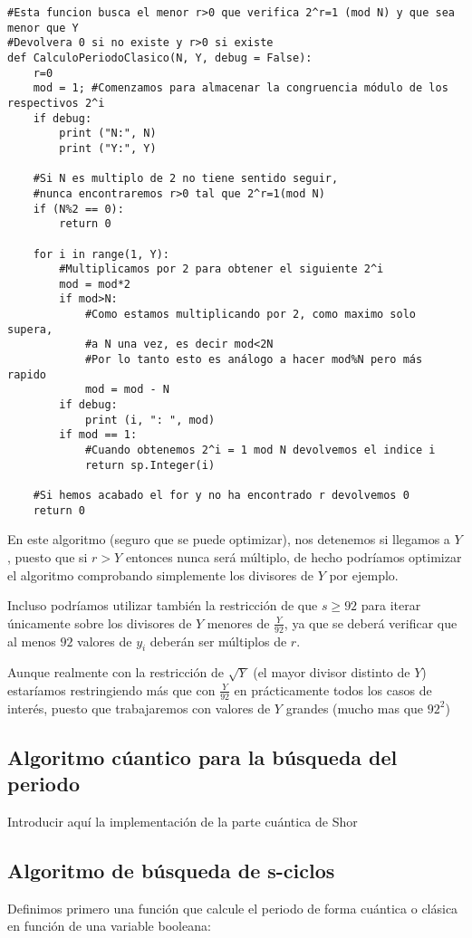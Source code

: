 \begin{verbatim}
#Esta funcion busca el menor r>0 que verifica 2^r=1 (mod N) y que sea menor que Y
#Devolvera 0 si no existe y r>0 si existe
def CalculoPeriodoClasico(N, Y, debug = False):
    r=0
    mod = 1; #Comenzamos para almacenar la congruencia módulo de los respectivos 2^i
    if debug:
        print ("N:", N)
        print ("Y:", Y)
        
    #Si N es multiplo de 2 no tiene sentido seguir,
    #nunca encontraremos r>0 tal que 2^r=1(mod N)
    if (N%2 == 0):
        return 0
    
    for i in range(1, Y):
        #Multiplicamos por 2 para obtener el siguiente 2^i
        mod = mod*2
        if mod>N:
            #Como estamos multiplicando por 2, como maximo solo supera,
            #a N una vez, es decir mod<2N
            #Por lo tanto esto es análogo a hacer mod%N pero más rapido
            mod = mod - N
        if debug:
            print (i, ": ", mod)
        if mod == 1:
            #Cuando obtenemos 2^i = 1 mod N devolvemos el indice i
            return sp.Integer(i)
    
    #Si hemos acabado el for y no ha encontrado r devolvemos 0
    return 0
\end{verbatim}

En este algoritmo (seguro que se puede optimizar), nos detenemos si llegamos a $Y$, puesto que si $r>Y$ entonces nunca será múltiplo, de hecho podríamos optimizar el algoritmo comprobando simplemente los divisores de $Y$ por ejemplo.

Incluso podríamos utilizar también la restricción de que $s\geq92$ para iterar únicamente sobre los divisores de $Y$ menores de $\frac{Y}{92}$, ya que se deberá verificar que al menos $92$ valores de $y_i$ deberán ser múltiplos de $r$.

Aunque realmente con la restricción de $\sqrt{Y}$ (el mayor divisor distinto de $Y$) estaríamos restringiendo más que con $\frac{Y}{92}$ en prácticamente todos los casos de interés, puesto que trabajaremos con valores de $Y$ grandes (mucho mas que $92^2$)



\subsection{Algoritmo cúantico para la búsqueda del periodo}
Introducir aquí la implementación de la parte cuántica de Shor



\subsection{Algoritmo de búsqueda de s-ciclos}
Definimos primero una función que calcule el periodo de forma cuántica o clásica en función de una variable booleana:

